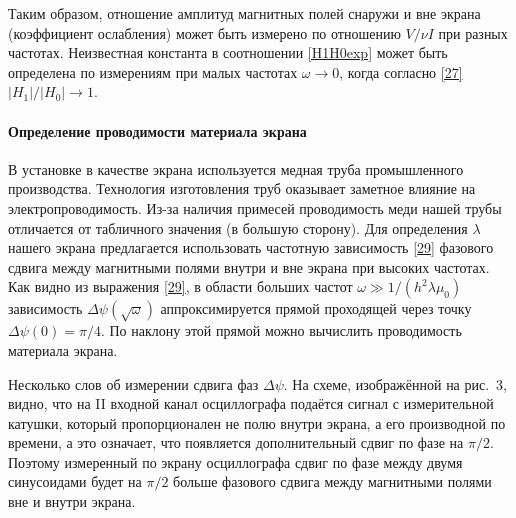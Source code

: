 Таким образом, отношение амплитуд магнитных полей снаружи и вне экрана
(коэффициент ослабления) может быть измерено
по отношению $V/\nu I$ при разных частотах. Неизвестная константа
в соотношении \eqref{H1H0exp} может быть определена по измерениям 
при малых частотах $\omega \to 0$, когда согласно \eqref{27} $|H_1|/|H_0| \to 1$.


\paragraph{Определение проводимости материала экрана}

В установке в качестве экрана используется медная труба промышленного производства. 
Технология изготовления труб оказывает заметное влияние на электропроводимость. 
Из-за наличия примесей проводимость меди нашей трубы отличается 
от табличного значения (в большую сторону). 
Для определения $\lambda$ нашего экрана предлагается использовать частотную 
зависимость \eqref{29} фазового сдвига между магнитными полями внутри и вне экрана 
при высоких частотах. Как видно из выражения \eqref{29}, 
в области больших частот $\omega \gg 1/(h^2\lambda\mu_0)$ зависимость 
$\Delta\psi(\sqrt{\omega})$ аппроксимируется прямой проходящей 
через точку $\Delta\psi(0)=\pi/4$. 
По наклону этой прямой можно вычислить проводимость материала экрана.

Несколько слов об измерении сдвига фаз $\Delta\psi$. На схеме, 
изображённой на рис.~3, видно, что на II входной канал
осциллографа подаётся сигнал с измерительной катушки, который пропорционален 
не полю внутри экрана, а его производной по времени, а это означает, 
что появляется дополнительный сдвиг по фазе на $\pi/2$. Поэтому измеренный 
по экрану осциллографа сдвиг по фазе между двумя синусоидами будет 
на $\pi/2$ больше фазового сдвига между магнитными полями вне и
внутри экрана.

